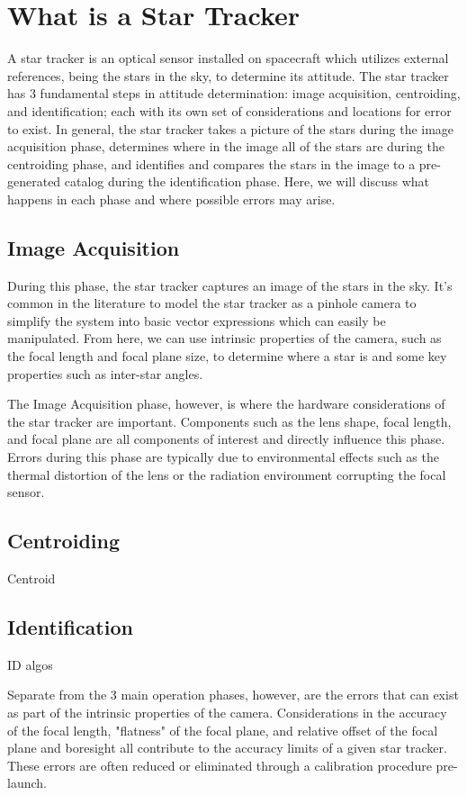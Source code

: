 \section{What is a Star Tracker}
\par \qquad A star tracker is an optical sensor installed on spacecraft which utilizes external references, being the stars in the sky, to determine its attitude.
The star tracker has 3 fundamental steps in attitude determination: image acquisition, centroiding, and identification; each with its own set of considerations and locations for error to exist.
In general, the star tracker takes a picture of the stars during the image acquisition phase, determines where in the image all of the stars are during the centroiding phase, and identifies and compares the stars in the image to a pre-generated catalog during the identification phase. Here, we will discuss what happens in each phase and where possible errors may arise.

\subsection{Image Acquisition}
\par \qquad During this phase, the star tracker captures an image of the stars in the sky.
It's common in the literature to model the star tracker as a pinhole camera to simplify the system into basic vector expressions which can easily be manipulated.
From here, we can use intrinsic properties of the camera, such as the focal length and focal plane size, to determine where a star is and some key properties such as inter-star angles.

\par \qquad The Image Acquisition phase, however, is where the hardware considerations of the star tracker are important.
Components such as the lens shape, focal length, and focal plane are all components of interest and directly influence this phase.
Errors during this phase are typically due to environmental effects such as the thermal distortion of the lens or the radiation environment corrupting the focal sensor. 

\subsection{Centroiding}
\par \qquad Centroid

\subsection{Identification}
\par \qquad ID algos

\par \qquad Separate from the 3 main operation phases, however, are the errors that can exist as part of the intrinsic properties of the camera.
Considerations in the accuracy of the focal length, "flatness" of the focal plane, and relative offset of the focal plane and boresight all contribute to the accuracy limits of a given star tracker.
These errors are often reduced or eliminated through a calibration procedure pre-launch.